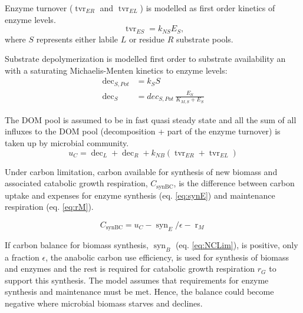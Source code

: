 Enzyme turnover ($\operatorname{tvr}_{ER}$ and $\operatorname{tvr}_{EL}$) is
modelled as first order kinetics of enzyme levels.
\begin{equation}
\label{eq:tvrE}
\operatorname{tvr}_{ES} = k_{NS} E_S \text{,}
\end{equation}
where $S$ represents either labile $L$ or residue $R$ substrate pools.  

% 
Substrate depolymerization is modelled first order to substrate
availability an with a saturating Michaelis-Menten kinetics to enzyme levels:
\begin{subequations}
\label{eq:dec}
\begin{align}
\operatorname{dec}_{S,Pot} &= k_S S
\\ 
\operatorname{dec}_S &= dec_{S,Pot} \, \frac{E_S}{K_{M,S} + E_S}
\end{align}
\end{subequations}
 
The DOM pool is assumed to be in fast quasi steady state and all the sum of all
influxes to the DOM pool (decomposition + part of the enzyme turnover) is taken
up by microbial community.
\begin{equation}
\label{eq:uC}
u_C = \operatorname{dec}_L + \operatorname{dec}_R +  k_{NB}
(\operatorname{tvr}_{ER} + \operatorname{tvr}_{EL})
\end{equation}

Under carbon limitation, carbon available for synthesis of new biomass and
associated catabolic growth respiration, $C_{\operatorname{synBC}}$, is the
difference between carbon uptake and expenses for enzyme synthesis (eq.
\ref{eq:synE}) and maintenance respiration (eq.
\ref{eq:rM}).

\begin{equation}
\label{eq:synBC} 
C_{\operatorname{synBC}} = u_C -
\operatorname{syn}_E/\epsilon - \operatorname{r}_{M}
\end{equation}

If carbon balance for biomass synthesis, $\operatorname{syn}_B$ (eq.
\ref{eq:NCLim}), is positive, only a fraction $\epsilon$, the anabolic
carbon use efficiency, is used for synthesis of biomass and enzymes
and the rest is required for catabolic growth respiration $r_G$ to support this
synthesis.
The model assumes that requirements for enzyme synthesis and maintenance must be
met. Hence, the balance could become negative where microbial biomass starves
and declines.

